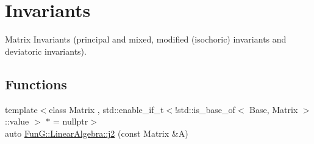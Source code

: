 \hypertarget{group__InvariantGroup}{\section{Invariants}
\label{group__InvariantGroup}
}


Matrix Invariants (principal and mixed, modified (isochoric) invariants and deviatoric invariants).  


\subsection*{Functions}
\begin{DoxyCompactItemize}
\item 
\hypertarget{group__InvariantGroup_ga9a2bc859fe1ae34b1a3ada91a39d69df}{{\footnotesize template$<$class Matrix , std\-::enable\-\_\-if\-\_\-t$<$!std\-::is\-\_\-base\-\_\-of$<$ Base, Matrix $>$\-::value $>$ $\ast$  = nullptr$>$ }\\auto \hyperlink{group__InvariantGroup_ga9a2bc859fe1ae34b1a3ada91a39d69df}{Fun\-G\-::\-Linear\-Algebra\-::j2} (const Matrix \&A)}\label{group__InvariantGroup_ga9a2bc859fe1ae34b1a3ada91a39d69df}


\end{DoxyCompactItemize}
